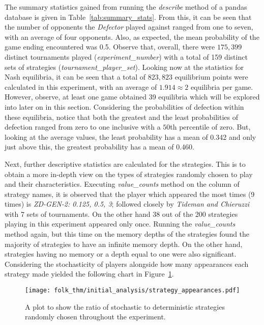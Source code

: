 The summary statistics gained from running the \textit{describe} method of a
pandas database is given in Table~\ref{tab:summary_stats}. From this, it can be
seen that the number of opponents the \textit{Defector} played against ranged
from one to seven, with an average of four opponents. Also, as expected, the
mean probability of the game ending encountered was 0.5. Observe that, overall,
there were \(175,399\) distinct tournaments played (\textit{experiment\_number}) with a total of 159 distinct sets of strategies (\textit{tournament\_player\_set}). 
Looking now at the statistics for Nash equilibria, it can be seen that a total
of \(823,823\) equilibrium points were calculated in this experiment, with an
average of \(1.914 \approx 2\) equilibria per game. However, observe, at least
one game obtained 39 equilibria which will be explored into later on in this
section. Considering the probabilities of defection within these equilibria,
notice that both the greatest and the least probabilities of defection ranged
from zero to one inclusive with a \(50\)th percentile of zero. But, looking at
the average values, the least probability has a mean of 0.342 and only just
above this, the greatest probability has a mean of 0.460.

Next, further descriptive statistics are calculated for the strategies. This is
to obtain a more in-depth view on the types of strategies randomly chosen to
play and their characteristics. Executing \textit{value\_counts} method on the
column of strategy names, it is observed that the player which appeared the most
times (9 times) is \textit{ZD-GEN-2: 0.125, 0.5, 3}; followed closely by
\textit{Tideman and Chieruzzi} with 7 sets of tournaments. On the other hand 38
out of the 200 strategies playing in this experiment appeared only once.
Running the \textit{value\_counts} method again, but this time on the memory
depths of the strategies found the majority of strategies to have an infinite
memory depth. On the other hand, strategies having no memory or a depth equal to
one were also significant. Considering the stochasticity of players alongside
how many appearances each strategy made yielded the following chart in
Figure~\ref{fig:stochastic_chart}.

\begin{figure}
    \centering
    \texttt{[image: folk\_thm/initial\_analysis/strategy\_appearances.pdf]}
    \caption{A plot to show the ratio of stochastic to deterministic strategies randomly chosen throughout the experiment.}\label{fig:stochastic_chart}
\end{figure}

